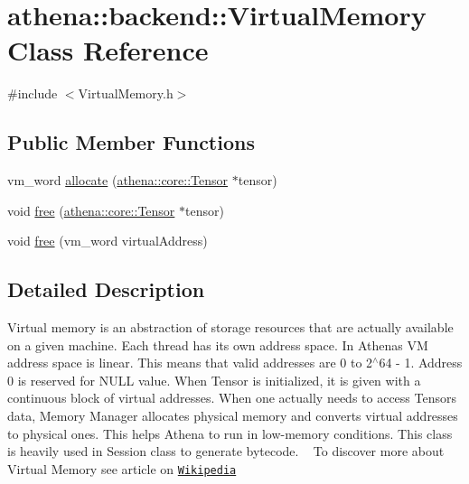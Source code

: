 \hypertarget{classathena_1_1backend_1_1_virtual_memory}{}\section{athena\+:\+:backend\+:\+:Virtual\+Memory Class Reference}
\label{classathena_1_1backend_1_1_virtual_memory}


{\ttfamily \#include $<$Virtual\+Memory.\+h$>$}

\subsection*{Public Member Functions}
\begin{DoxyCompactItemize}
\item 
vm\+\_\+word \mbox{\hyperlink{classathena_1_1backend_1_1_virtual_memory_a22be58a8e0cb574a7d46d4095cb64ac5}{allocate}} (\mbox{\hyperlink{classathena_1_1core_1_1_tensor}{athena\+::core\+::\+Tensor}} $\ast$tensor)
\item 
void \mbox{\hyperlink{classathena_1_1backend_1_1_virtual_memory_a73815358c436f8f6dd73d49d4d5d189d}{free}} (\mbox{\hyperlink{classathena_1_1core_1_1_tensor}{athena\+::core\+::\+Tensor}} $\ast$tensor)
\item 
void \mbox{\hyperlink{classathena_1_1backend_1_1_virtual_memory_ab24e17b8e8b2f8278b56b84dfdda42a3}{free}} (vm\+\_\+word virtual\+Address)
\end{DoxyCompactItemize}


\subsection{Detailed Description}
Virtual memory is an abstraction of storage resources that are actually available on a given machine. Each thread has its own address space. In Athena\textquotesingle{}s VM address space is linear. This means that valid addresses are 0 to 2$^\wedge$64 -\/ 1. Address 0 is reserved for N\+U\+LL value. When Tensor is initialized, it is given with a continuous block of virtual addresses. When one actually needs to access Tensor\textquotesingle{}s data, Memory Manager allocates physical memory and converts virtual addresses to physical ones. This helps Athena to run in low-\/memory conditions. This class is heavily used in Session class to generate bytecode. ~\newline
 To discover more about Virtual Memory see article on \href{https://en.wikipedia.org/wiki/Virtual_memory}{\tt Wikipedia} 

